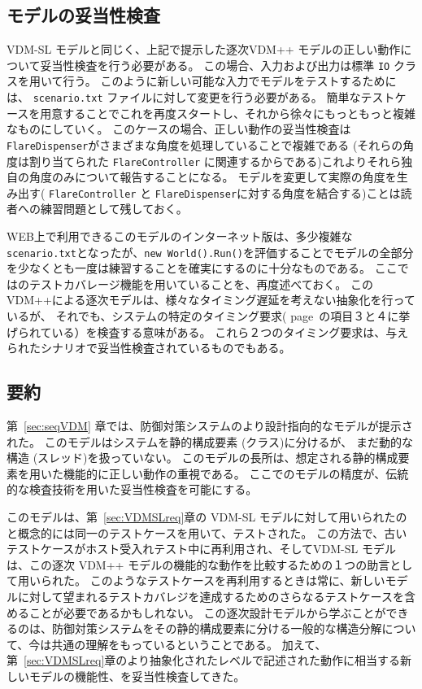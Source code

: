 \documentclass[\pformat,12pt]{jreport}
\begin{document}
\subsection{モデルの妥当性検査}

VDM-SL モデルと同じく、上記で提示した逐次VDM++ モデルの正しい動作について妥当性検査を行う必要がある。
この場合、入力および出力は標準 \texttt{IO} クラスを用いて行う。
このように新しい可能な入力でモデルをテストするためには、 \texttt{scenario.txt} ファイルに対して変更を行う必要がある。
簡単なテストケースを用意することでこれを再度スタートし、それから徐々にもっともっと複雑なものにしていく。
このケースの場合、正しい動作の妥当性検査は\texttt{FlareDispenser}がさまざまな角度を処理していることで複雑である (それらの角度は割り当てられた \texttt{FlareController} に関連するからである)これよりそれら独自の角度のみについて報告することになる。
モデルを変更して実際の角度を生み出す( \texttt{FlareController} と \texttt{FlareDispenser}に対する角度を結合する)ことは読者への練習問題として残しておく。

WEB上で利用できるこのモデルのインターネット版は、多少複雑な\texttt{scenario.txt}となったが、\texttt{new World().Run()}を評価することでモデルの全部分を少なくとも一度は練習することを確実にするのに十分なものである。
ここでは\VDMTools のテストカバレージ機能を用いていることを、再度述べておく。
このVDM++による逐次モデルは、様々なタイミング遅延を考えない抽象化を行っているが、
それでも、システムの特定のタイミング要求( page~\pageref{timereq34}の項目３と４に挙げられている）を検査する意味がある。
これら２つのタイミング要求は、与えられたシナリオで妥当性検査されているものでもある。

\subsection{要約}

第~\ref{sec:seqVDM} 章では、防御対策システムのより設計指向的なモデルが提示された。
このモデルはシステムを静的構成要素 (クラス)に分けるが、 まだ動的な構造 (スレッド)を扱っていない。
このモデルの長所は、想定される静的構成要素を用いた機能的に正しい動作の重視である。
ここでのモデルの精度が、伝統的な検査技術を用いた妥当性検査を可能にする。

このモデルは、第~\ref{sec:VDMSLreq}章の VDM-SL モデルに対して用いられたのと概念的には同一のテストケースを用いて、テストされた。
この方法で、古いテストケースがホスト受入れテスト中に再利用され、そしてVDM-SL モデルは、この逐次 VDM++ モデルの機能的な動作を比較するための１つの助言として用いられた。
このようなテストケースを再利用するときは常に、新しいモデルに対して望まれるテストカバレジを達成するためのさらなるテストケースを含めることが必要であるかもしれない。
この逐次設計モデルから学ぶことができるのは、防御対策システムをその静的構成要素に分ける一般的な構造分解について、今は共通の理解をもっているということである。
加えて、 第~\ref{sec:VDMSLreq}章のより抽象化されたレベルで記述された動作に相当する新しいモデルの機能性、を妥当性検査してきた。
\end{document}
